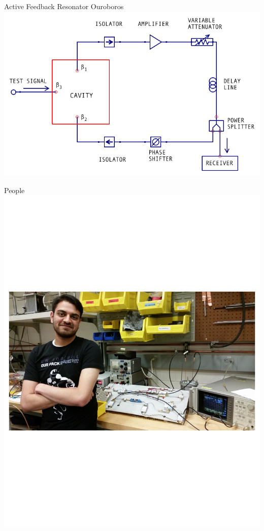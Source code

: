 \documentclass{beamer}
\begin{document}
\begin{frame}{Active Feedback Resonator}
{\tiny Ouroboros}
\includegraphics[width=\textwidth]{export_ouroboros}
\end{frame}

\begin{frame}{People}
\includegraphics[width=\textwidth]{kunal_pic}
\end{frame}
\end{document}
